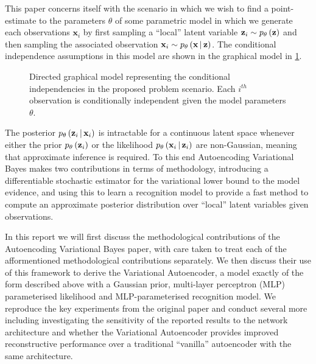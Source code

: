 \documentclass[../report.tex]{subfiles}
\begin{document}
This paper concerns itself with the scenario in which we wish to find a point-estimate to the parameters $\theta$ of some parametric model in which we generate each observations $\mathbf{x}_i$ by first sampling a ``local'' latent variable $\mathbf{z}_i \sim p_\theta \left( \mathbf{z}\right)$ and then sampling the associated observation $\mathbf{x}_i \sim p_\theta \left(\mathbf{x} \, \middle\vert \, \mathbf{z} \right)$. The conditional independence assumptions in this model are shown in the graphical model in \ref{fig:graph}.

\begin{figure}[!htbp]
\centering
{}
\caption{\label{fig:graph}Directed graphical model representing the conditional independencies in the proposed problem scenario. Each $i^{th}$ observation is conditionally independent given the model parameters $\theta$.}
\end{figure}

The posterior $p_\theta \left(\mathbf{z}_i \, \middle\vert \, \mathbf{x}_i \right)$ is intractable for a continuous latent space whenever either the prior $p_\theta \left( \mathbf{z}_i\right)$ or the likelihood $p_\theta \left(\mathbf{x}_i \, \middle\vert \, \mathbf{z}_i \right)$ are non-Gaussian, meaning that approximate inference is required. To this end Autoencoding Variational Bayes makes two contributions in terms of methodology, introducing a differentiable stochastic estimator for the variational lower bound to the model evidence, and using this to learn a recognition model to provide a fast method to compute an approximate posterior distribution over ``local'' latent variables given observations.

In this report we will first discuss the methodological contributions of the Autoencoding Variational Bayes paper, with care taken to treat each of the afformentioned methodological contributions separately. We then discuss their use of this framework to derive the Variational Autoencoder, a model exactly of the form described above with a Gaussian prior, multi-layer perceptron (MLP) parameterised likelihood and MLP-parameterised recognition model. We reproduce the key experiments from the original paper and conduct several more including investigating the sensitivity of the reported results to the network architecture and whether the Variational Autoencoder provides improved reconstructive performance over a traditional ``vanilla'' autoencoder with the same architecture.
\end{document}
